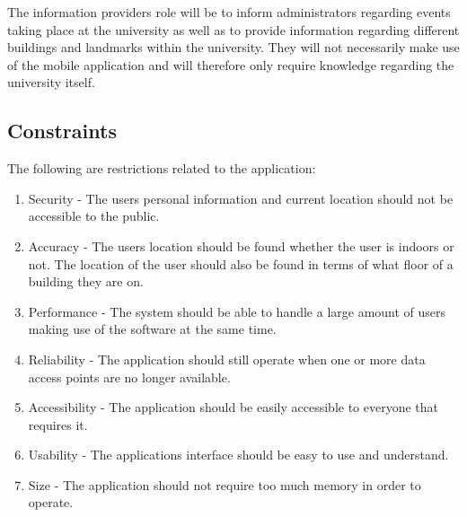 \documentclass[11pt,a4paper]{article}
\begin{document}
	The information providers role will be to inform administrators regarding events taking place at the university as well as to provide information regarding different buildings and landmarks within the university. They will not necessarily make use of the mobile application and will therefore only require knowledge regarding the university itself.

	\subsection{Constraints}
	The following are restrictions related to the application:
		\begin{enumerate}
				\renewcommand{\labelenumi}{{\textbf{\arabic{enumi}.}}}
				\item Security  - The users personal information and current location should not be accessible to the public.
				\item Accuracy - The users location should be found whether the user is indoors or not. The location of the user should also be found in terms of what floor of a building they are on.
				\item Performance - The system should be able to handle a large amount of users making use of the software at the same time.
				\item Reliability - The application should still operate when one or more data access points are no longer available.
				\item Accessibility - The application should be easily accessible to everyone that requires it.
				\item Usability - The applications interface should be easy to use and understand.
				\item Size - The application should not require too much memory in order to operate.
				\end{enumerate}
\end{document}
